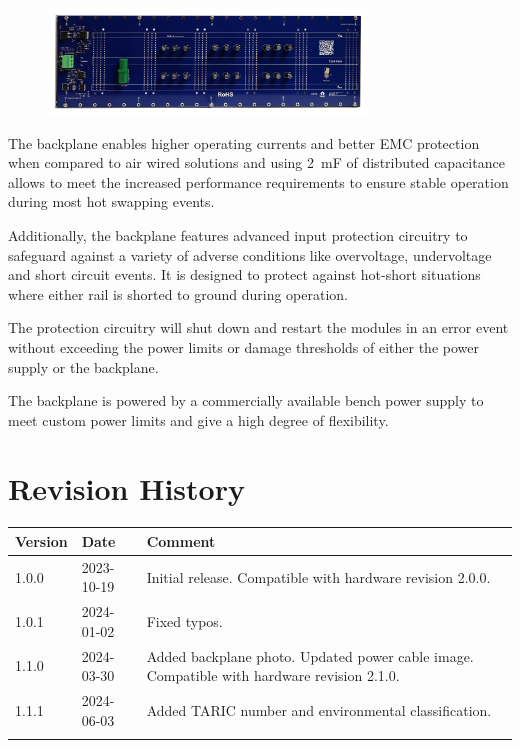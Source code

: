 \documentclass[10pt]{datasheet}
\newcommand{\versionNumber}{1.1.1}
\begin{document}
\begin{figure}[ht]
    \centering
    \includegraphics[width=8.5cm]{images/backplane.jpg}
\end{figure}

The backplane enables higher operating currents and better EMC protection when compared to air wired solutions and using \qty{2}{\milli\farad} of distributed capacitance allows to meet the increased performance requirements to ensure stable operation during most hot swapping events.

Additionally, the backplane features advanced input protection circuitry to safeguard against a variety of adverse conditions like overvoltage, undervoltage and short circuit events. It is designed to protect against hot-short situations where either rail is shorted to ground during operation.

The protection circuitry will shut down and restart the modules in an error event without exceeding the power limits or damage thresholds of either the power supply or the backplane.

The backplane is powered by a commercially available bench power supply to meet custom power limits and give a high degree of flexibility.

\vfill\break

\onecolumn

\section{Revision History}
\begin{table}[h]
    \centering
    \begin{tabularx}{\textwidth}{l| l | >{\raggedright\arraybackslash}X}
        \thickhline
        Version& Date& Comment\\
        \hline
        1.0.0 &2023-10-19 & Initial release. Compatible with hardware revision 2.0.0.\\
        1.0.1 &2024-01-02 & Fixed typos.\\
        1.1.0 &2024-03-30 & Added backplane photo. Updated power cable image. Compatible with hardware revision 2.1.0.\\
        \versionNumber &2024-06-03 & Added TARIC number and environmental classification.\\
        \thickhline
    \end{tabularx}
\end{table}
\end{document}
